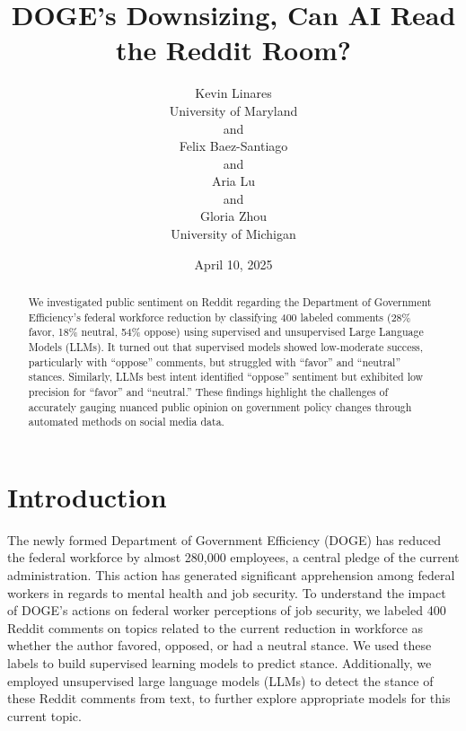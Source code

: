 \documentclass[
  12pt]{article}
\begin{document}
\def\spacingset#1{\renewcommand{\baselinestretch}%
{#1}\small\normalsize} \spacingset{1}



\date{April 10, 2025}
\title{\bf DOGE's Downsizing, Can AI Read the Reddit Room?}
\author{
Kevin Linares\\
University of Maryland\\
and\\Felix Baez-Santiago\\
and\\Aria Lu\\
and\\Gloria Zhou\\
University of Michigan\\
}
\maketitle

\bigskip
\bigskip
\begin{abstract}
We investigated public sentiment on Reddit regarding the Department of
Government Efficiency's federal workforce reduction by classifying 400
labeled comments (28\% favor, 18\% neutral, 54\% oppose) using
supervised and unsupervised Large Language Models (LLMs). It turned out
that supervised models showed low-moderate success, particularly with
``oppose'' comments, but struggled with ``favor'' and ``neutral''
stances. Similarly, LLMs best intent identified ``oppose'' sentiment but
exhibited low precision for ``favor'' and ``neutral.'' These findings
highlight the challenges of accurately gauging nuanced public opinion on
government policy changes through automated methods on social media
data.
\end{abstract}


\newpage
\spacingset{1.9} %


\section{Introduction}\label{sec-intro}

The newly formed Department of Government Efficiency (DOGE) has reduced
the federal workforce by almost 280,000 employees, a central pledge of
the current administration. This action has generated significant
apprehension among federal workers in regards to mental health and job
security. To understand the impact of DOGE's actions on federal worker
perceptions of job security, we labeled 400 Reddit comments on topics
related to the current reduction in workforce as whether the author
favored, opposed, or had a neutral stance. We used these labels to build
supervised learning models to predict stance. Additionally, we employed
unsupervised large language models (LLMs) to detect the stance of these
Reddit comments from text, to further explore appropriate models for
this current topic.
\end{document}
